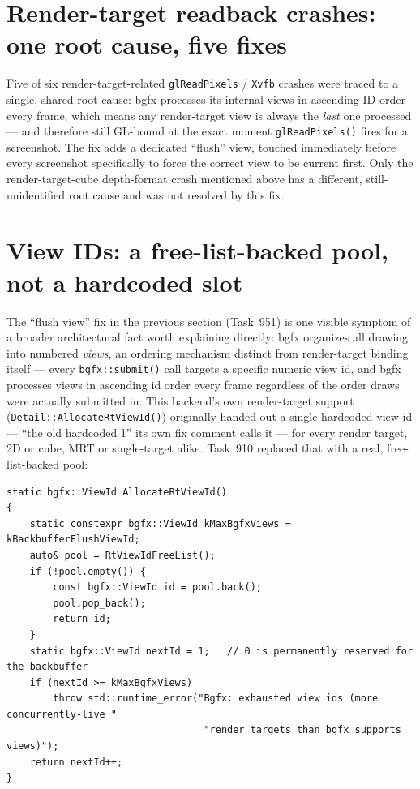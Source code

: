 \section{Render-target readback crashes: one root cause, five fixes}

Five of six render-target-related \texttt{glReadPixels} / \texttt{Xvfb} crashes were traced to
a single, shared root cause: bgfx processes its internal views in ascending ID order every
frame, which means any render-target view is always the \emph{last} one processed --- and
therefore still GL-bound at the exact moment \texttt{glReadPixels()} fires for a screenshot.
The fix adds a dedicated ``flush'' view, touched immediately before every screenshot
specifically to force the correct view to be current first. Only the render-target-cube
depth-format crash mentioned above has a different, still-unidentified root cause and was
not resolved by this fix.

\section{View IDs: a free-list-backed pool, not a hardcoded slot}
\label{sec:bgfx-view-ids}

The ``flush view'' fix in the previous section (Task~951) is one visible symptom of a broader
architectural fact worth explaining directly: bgfx organizes all drawing into numbered
\emph{views}, an ordering mechanism distinct from render-target binding itself --- every
\texttt{bgfx::submit()} call targets a specific numeric view id, and bgfx processes views in
ascending id order every frame regardless of the order draws were actually submitted in. This
backend's own render-target support (\texttt{Detail::AllocateRtViewId()}) originally handed out
a single hardcoded view id --- ``the old hardcoded 1'' its own fix comment calls it --- for
every render target, 2D or cube, MRT or single-target alike. Task~910 replaced that with a real,
free-list-backed pool:

\begin{lstlisting}
static bgfx::ViewId AllocateRtViewId()
{
    static constexpr bgfx::ViewId kMaxBgfxViews = kBackbufferFlushViewId;
    auto& pool = RtViewIdFreeList();
    if (!pool.empty()) {
        const bgfx::ViewId id = pool.back();
        pool.pop_back();
        return id;
    }
    static bgfx::ViewId nextId = 1;   // 0 is permanently reserved for the backbuffer
    if (nextId >= kMaxBgfxViews)
        throw std::runtime_error("Bgfx: exhausted view ids (more concurrently-live "
                                  "render targets than bgfx supports views)");
    return nextId++;
}
\end{lstlisting}

